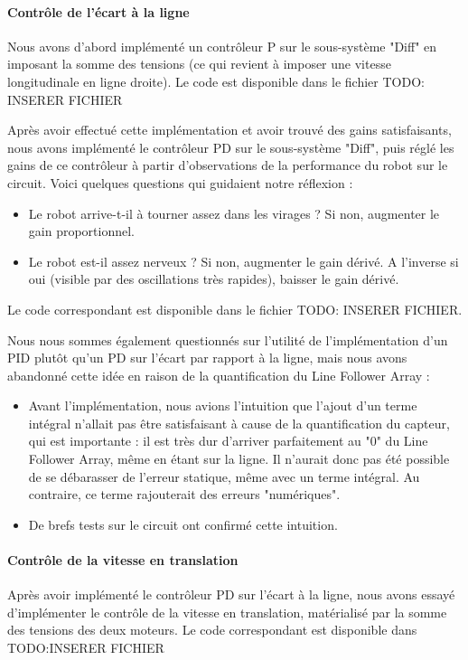 \documentclass{report}
\begin{document}
\paragraph{Contrôle de l'écart à la ligne} 

Nous avons d'abord implémenté un contrôleur P sur le sous-système "Diff" en imposant la somme des tensions (ce qui revient à imposer une vitesse longitudinale en ligne droite). Le code est disponible dans le fichier TODO: INSERER FICHIER

Après avoir effectué cette implémentation et avoir trouvé des gains satisfaisants, nous avons implémenté le contrôleur PD sur le sous-système "Diff", puis réglé les gains de ce contrôleur à partir d'observations de la performance du robot sur le circuit. Voici quelques questions qui guidaient notre réflexion :
\begin{itemize}
    \item Le robot arrive-t-il à tourner assez dans les virages ? Si non, augmenter le gain proportionnel.
    \item Le robot est-il assez nerveux ? Si non, augmenter le gain dérivé. A l'inverse si oui (visible par des oscillations très rapides), baisser le gain dérivé.
\end{itemize}

Le code correspondant est disponible dans le fichier TODO: INSERER FICHIER.

Nous nous sommes également questionnés sur l'utilité de l'implémentation d'un PID plutôt qu'un PD sur l'écart par rapport à la ligne, mais nous avons abandonné cette idée en raison de la quantification du Line Follower Array :
\begin{itemize}
    \item Avant l'implémentation, nous avions l'intuition que l'ajout d'un terme intégral n'allait pas être satisfaisant à cause de la quantification du capteur, qui est importante : il est très dur d'arriver parfaitement au "0" du Line Follower Array, même en étant sur la ligne. Il n'aurait donc pas été possible de se débarasser de l'erreur statique, même avec un terme intégral. Au contraire, ce terme rajouterait des erreurs "numériques".
    \item De brefs tests sur le circuit ont confirmé cette intuition.
\end{itemize}

\paragraph{Contrôle de la vitesse en translation}
Après avoir implémenté le contrôleur PD sur l'écart à la ligne, nous avons essayé d'implémenter le contrôle de la vitesse en translation, matérialisé par la somme des tensions des deux moteurs. Le code correspondant est disponible dans TODO:INSERER FICHIER
\end{document}
